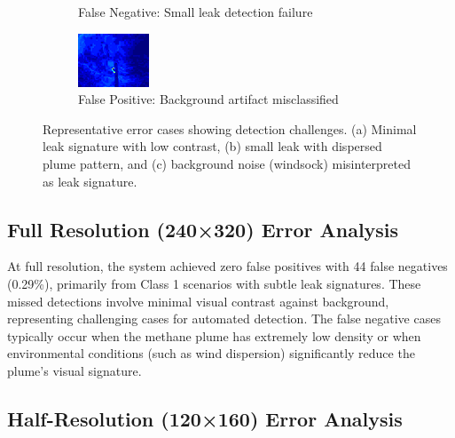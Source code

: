 \begin{figure}[htbp]
\begin{subfigure}[t]{0.31\textwidth}
\caption{False Negative: Small leak detection failure}
\label{fig:fn_half}
\end{subfigure}
\hfill
\begin{subfigure}[t]{0.31\textwidth}
\centering
\includegraphics[width=\textwidth]{images/fp_sample_60x80.png}
\caption{False Positive: Background artifact misclassified}
\label{fig:fp_quarter}
\end{subfigure}
\caption{Representative error cases showing detection challenges. (a) Minimal leak signature with low contrast, (b) small leak with dispersed plume pattern, and (c) background noise (windsock) misinterpreted as leak signature.}
\label{fig:error_analysis}
\end{figure}

\subsection{Full Resolution (240×320) Error Analysis}

At full resolution, the system achieved zero false positives with 44 false negatives (0.29\%), primarily from Class 1 scenarios with subtle leak signatures. These missed detections involve minimal visual contrast against background, representing challenging cases for automated detection. The false negative cases typically occur when the methane plume has extremely low density or when environmental conditions (such as wind dispersion) significantly reduce the plume's visual signature.

\subsection{Half-Resolution (120×160) Error Analysis}

